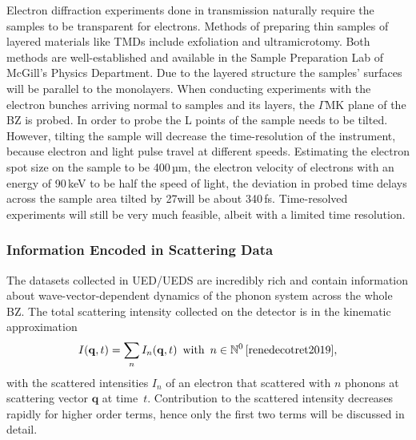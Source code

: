 Electron diffraction experiments done in transmission naturally require the samples to be transparent for electrons.
Methods of preparing thin samples of layered materials like \acp{TMD} include exfoliation\cite{mak2010} and ultramicrotomy\cite{malis1990}.
Both methods are well-established and available in the Sample Preparation Lab of McGill's Physics Department.
Due to the layered structure the samples' surfaces will be parallel to the monolayers.
When conducting experiments with the electron bunches arriving normal to \ts\space samples and its layers, the $\Gamma\mathrm{MK}$ plane of the \ac{BZ} is probed.
In order to probe the L points of \ts\space the sample needs to be tilted.
However, tilting the sample will decrease the time-resolution of the instrument, because electron and light pulse travel at different speeds.
Estimating the electron spot size on the sample to be 400\,µm, the electron velocity of electrons with an energy of 90\,keV to be half the speed of light, the deviation in probed time delays across the sample area tilted by 27\textdegree will be about 340\,fs.
Time-resolved experiments will still be very much feasible, albeit with a limited time resolution.

\subsubsection*{Information Encoded in Scattering Data}
The datasets collected in \ac{UED}/\ac{UEDS} are incredibly rich and contain information about wave-vector-dependent dynamics of the phonon system across the whole \ac{BZ}.
The total scattering intensity collected on the detector is in the kinematic approximation
\begin{equation} I(\mathbf{q},t) = \sum_n I_n(\mathbf{q},t)\enspace\text{with}\enspace n \in\mathbb{N}^0\,\label{eq:I}\text{\cite{renedecotret2019}},\end{equation}
with the scattered intensities $I_n$ of an electron that scattered with $n$ phonons at scattering vector $\mathbf{q}$ at time~$t$.
Contribution to the scattered intensity decreases rapidly for higher order terms, hence only the first two terms will be discussed in detail.

